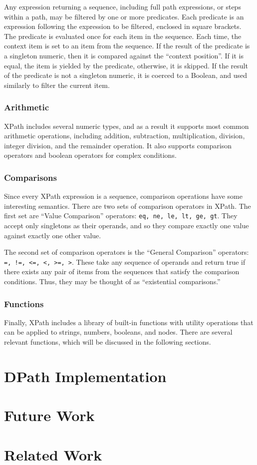 \documentclass{scrartcl}
\begin{document}
Any expression returning a sequence, including full path expressions, or steps
within a path, may be filtered by one or more predicates. Each predicate is an
expression following the expression to be filtered, enclosed in square brackets.
The predicate is evaluated once for each item in the sequence. Each time, the
context item is set to an item from the sequence. If the result of the predicate
is a singleton numeric, then it is compared against the ``context position''. If
it is equal, the item is yielded by the predicate, otherwise, it is skipped. If
the result of the predicate is not a singleton numeric, it is coerced to a
Boolean, and used similarly to filter the current item.

\subsubsection{Arithmetic}

XPath includes several numeric types, and as a result it supports most common
arithmetic operations, including addition, subtraction, multiplication,
division, integer division, and the remainder operation. It also supports
comparison operators and boolean operators for complex conditions.

\subsubsection{Comparisons}

Since every XPath expression is a sequence, comparison operations have some
interesting semantics. There are two sets of comparison operators in XPath. The
first set are ``Value Comparison'' operators: \texttt{eq, ne, le, lt, ge, gt}.
They accept only singletons as their operands, and so they compare exactly one
value against exactly one other value.

The second set of comparison operators is the ``General Comparison'' operators:
\texttt{=, !=, <=, <, >=, >}. These take any sequence of operands and return
true if there exists any pair of items from the sequences that satisfy the
comparison conditions. Thus, they may be thought of as ``existential
comparisons.''

\subsubsection{Functions}

Finally, XPath includes a library of built-in functions with utility operations
that can be applied to strings, numbers, booleans, and nodes. There are several
relevant functions, which will be discussed in the following sections.

\section{DPath Implementation}
\label{sec:dpath}

\section{Future Work}
\label{sec:future}

\section{Related Work}
\label{sec:related}




\end{document}
